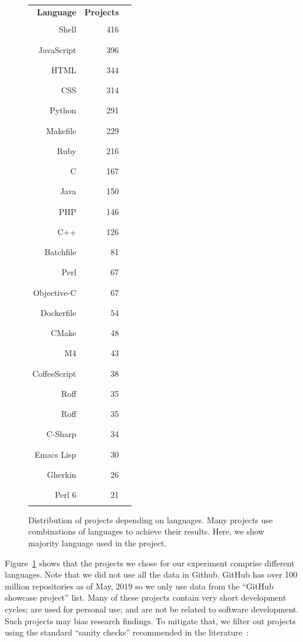 \documentclass[smallextended]{svjour3}
\newcommand{\fig}[1]{Figure~\ref{fig:#1}}
\begin{document}
\begin{figure}[!t]
\centering
{\small \renewcommand{\baselinestretch}{0.7}
\begin{tabular}{rrl}
    \textbf{Language} & \textbf{Projects} & \\
    Shell & 416 &\rule{86.17pt}{8pt} \\
    JavaScript & 396 &\rule{77.83pt}{8pt} \\
    HTML & 344 &\rule{76.67pt}{8pt} \\
    CSS & 314 &\rule{65.5pt}{8pt} \\
    Python & 291 &\rule{51pt}{8pt} \\
    Makefile & 229 &\rule{47.17pt}{8pt} \\
    Ruby & 216 &\rule{44.17pt}{8pt} \\
    C & 167 &\rule{41.83pt}{8pt} \\
    Java & 150 &\rule{39.67pt}{8pt} \\
    PHP & 146 &\rule{36.22pt}{8pt} \\
    C++ & 126 &\rule{34pt}{8pt} \\
    Batchfile & 81  &\rule{30.67pt}{8pt} \\
    Perl & 67 &\rule{28pt}{8pt} \\
    Objective-C & 67 &\rule{28pt}{8pt} \\
    Dockerfile & 54 &\rule{26.17pt}{8pt} \\
    CMake & 48 &\rule{22pt}{8pt} \\
    M4 & 43 &\rule{21.83pt}{8pt} \\
    CoffeeScript & 38 &\rule{19.83pt}{8pt} \\
    Roff & 35 &\rule{16.33pt}{8pt} \\
    Roff & 35 &\rule{16.67pt}{8pt} \\
    C-Sharp & 34 &\rule{15.67pt}{8pt} \\
    Emacs Lisp & 30 &\rule{14.5pt}{8pt} \\
    Gherkin & 26 &\rule{12.5pt}{8pt} \\
    Perl 6 & 21 &\rule{10.33pt}{8pt} \\
    
\end{tabular}}
\caption{Distribution of projects depending on languages.
Many  projects use combinations of languages to
achieve their results. Here, we show majority language used in the project.}
\label{fig:lang_projects}
\end{figure}
\fig{lang_projects} shows that the projects we chose for our experiment comprise different languages. Note that we did not use all the data in Github. GitHub has over  100 million repositories as of May, 2019
so we only use data from the
  ``GitHub showcase project'' list.
 Many of these projects contain very short development cycles; are used for personal use;
and are  not be related to software development. Such projects may bias research findings. 
To mitigate that, we filter out projects using the standard ``sanity checks'' recommended in the literature~\cite{perils,curating}:  
\end{document}
